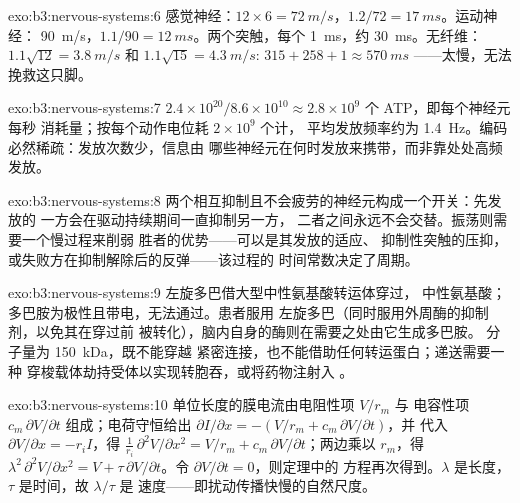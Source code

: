 \begin{solution}{exo:b3:nervous-systems:6}
感觉神经：$12\times 6 = \qty{72}{m/s}$，$1.2/72 = \qty{17}{ms}$。运动神经：
\qty{90}{m/s}，$1.1/90 = \qty{12}{ms}$。两个突触，每个 \qty{1}{ms}，约
\qty{30}{ms}。无纤维：$1.1\sqrt{12} = \qty{3.8}{m/s}$ 和
$1.1\sqrt{15} = \qty{4.3}{m/s}$: $315 + 258 + 1 \approx \qty{570}{ms}$
——太慢，无法挽救这只脚。
\end{solution}

\begin{solution}{exo:b3:nervous-systems:7}
$2.4\times 10^{20}/8.6\times 10^{10} \approx 2.8\times 10^{9}$ 个 ATP，即每个神经元每秒
消耗量；按每个动作电位耗 $2\times 10^{9}$ 个计，
平均发放频率约为 \qty{1.4}{Hz}。编码必然稀疏：发放次数少，信息由
哪些神经元在何时发放来携带，而非靠处处高频发放。
\end{solution}

\begin{solution}{exo:b3:nervous-systems:8}
两个相互抑制且不会疲劳的神经元构成一个开关：先发放的
一方会在驱动持续期间一直抑制另一方，
二者之间永远不会交替。振荡则需要一个慢过程来削弱
胜者的优势——可以是其发放的适应、
抑制性突触的压抑，或失败方在抑制解除后的反弹——该过程的
时间常数决定了周期。
\end{solution}

\begin{solution}{exo:b3:nervous-systems:9}
左旋多巴借大型中性氨基酸转运体穿过，
中性氨基酸；多巴胺为极性且带电，无法通过。患者服用
左旋多巴（同时服用外周酶的抑制剂，以免其在穿过前
被转化），脑内自身的酶则在需要之处由它生成多巴胺。
分子量为 \qty{150}{kDa}，既不能穿越
紧密连接，也不能借助任何转运蛋白；递送需要一种
穿梭载体劫持受体以实现转胞吞，或将药物注射入
。
\end{solution}

\begin{solution}{exo:b3:nervous-systems:10}
单位长度的膜电流由电阻性项 $V/r_{m}$ 与
电容性项 $c_{m}\,\partial V/\partial t$ 组成；电荷守恒给出
$\partial I/\partial x = -(V/r_{m} + c_{m}\,\partial V/\partial t)$，并
代入 $\partial V/\partial x = -r_{i}I$，得 $\frac{1}{r_{i}}\,\partial^{2}V/
\partial x^{2} = V/r_{m} + c_{m}\,\partial V/\partial t$；两边乘以
$r_{m}$，得 $\lambda^{2}\,\partial^{2}V/\partial x^{2} = V + \tau\,\partial
V/\partial t$。令 $\partial V/\partial t = 0$，则定理中的
方程再次得到。$\lambda$ 是长度，$\tau$ 是时间，故 $\lambda/\tau$ 是
速度——即扰动传播快慢的自然尺度。
\end{solution}

